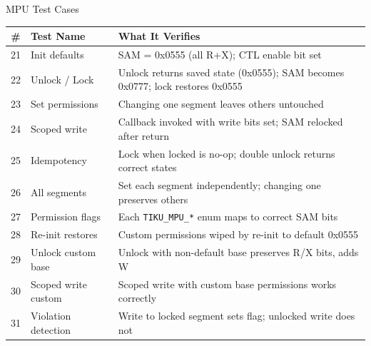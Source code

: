 \documentclass[aspectratio=169, 10pt]{beamer}
\begin{document}
\begin{frame}{MPU Test Cases}
\begin{table}
\centering
\small
\begin{tabular}{@{}clp{7.5cm}@{}}
\toprule
\textbf{\#} & \textbf{Test Name} & \textbf{What It Verifies} \\
\midrule
21 & Init defaults       & SAM = 0x0555 (all R+X); CTL enable bit set \\
22 & Unlock / Lock       & Unlock returns saved state (0x0555); SAM becomes 0x0777;
                           lock restores 0x0555 \\
23 & Set permissions     & Changing one segment leaves others untouched \\
24 & Scoped write        & Callback invoked with write bits set; SAM relocked after return \\
25 & Idempotency         & Lock when locked is no-op; double unlock returns correct states \\
26 & All segments        & Set each segment independently; changing one preserves others \\
27 & Permission flags    & Each \texttt{TIKU\_MPU\_*} enum maps to correct SAM bits \\
28 & Re-init restores    & Custom permissions wiped by re-init to default 0x0555 \\
29 & Unlock custom base  & Unlock with non-default base preserves R/X bits, adds W \\
30 & Scoped write custom & Scoped write with custom base permissions works correctly \\
31 & Violation detection & Write to locked segment sets flag; unlocked write does not \\
\bottomrule
\end{tabular}
\end{table}
\end{frame}
\end{document}
